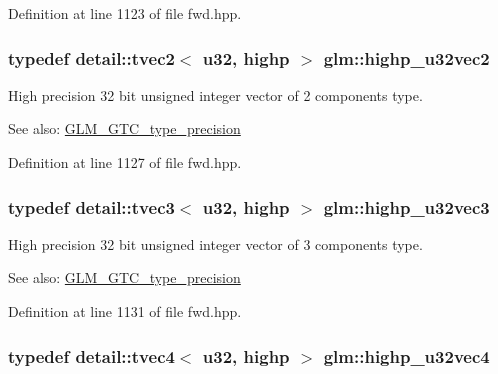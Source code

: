 Definition at line 1123 of file fwd.hpp.\hypertarget{group__gtc__type__precision_gddb81e8e12bd640e188744ed372c95bb}{
\subsubsection[highp\_\-u32vec2]{\setlength{\rightskip}{0pt plus 5cm}typedef detail::tvec2$<$ u32, highp $>$ {\bf glm::highp\_\-u32vec2}}}
\label{group__gtc__type__precision_gddb81e8e12bd640e188744ed372c95bb}


High precision 32 bit unsigned integer vector of 2 components type. \begin{Desc}
\item[See also:]\hyperlink{group__gtc__type__precision}{GLM\_\-GTC\_\-type\_\-precision} \end{Desc}


Definition at line 1127 of file fwd.hpp.\hypertarget{group__gtc__type__precision_gb1e386f5e415e00f800edf5d15207286}{
\subsubsection[highp\_\-u32vec3]{\setlength{\rightskip}{0pt plus 5cm}typedef detail::tvec3$<$ u32, highp $>$ {\bf glm::highp\_\-u32vec3}}}
\label{group__gtc__type__precision_gb1e386f5e415e00f800edf5d15207286}


High precision 32 bit unsigned integer vector of 3 components type. \begin{Desc}
\item[See also:]\hyperlink{group__gtc__type__precision}{GLM\_\-GTC\_\-type\_\-precision} \end{Desc}


Definition at line 1131 of file fwd.hpp.\hypertarget{group__gtc__type__precision_g9418a8d549d344d4f7b7158771a2fdfe}{
\subsubsection[highp\_\-u32vec4]{\setlength{\rightskip}{0pt plus 5cm}typedef detail::tvec4$<$ u32, highp $>$ {\bf glm::highp\_\-u32vec4}}}
\label{group__gtc__type__precision_g9418a8d549d344d4f7b7158771a2fdfe}


